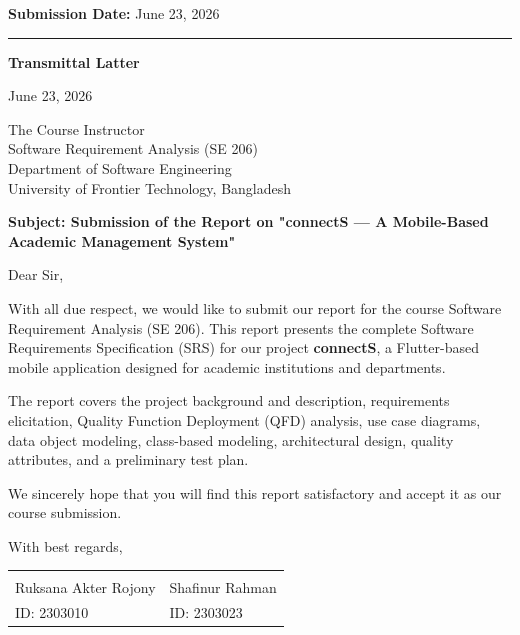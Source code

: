\documentclass[12pt,a4paper]{article}
\begin{document}
\begin{titlepage}
\begin{minipage}[t][\paperheight][s]{\paperwidth}
{\color{navyblue}\textbf{Submission Date:} June 23, 2026}
\vfill
{\color{green!70!black}\rule{\paperwidth}{3pt}}
\end{minipage}
\end{titlepage}
\restoregeometry

\newpage
\thispagestyle{plain}
\begin{center}{\large\bfseries\color{navyblue}  Transmittal Latter}\end{center}
\vspace{0.4em}

June 23, 2026

\medskip
The Course Instructor\\
Software Requirement Analysis (SE 206)\\
Department of Software Engineering\\
University of Frontier Technology, Bangladesh

\medskip
\textbf{Subject: Submission of the Report on "connectS --- A Mobile-Based Academic Management System"}

\medskip
Dear Sir,

With all due respect, we would like to submit our report for the course Software Requirement Analysis (SE 206). This report presents the complete Software Requirements Specification (SRS) for our project \textbf{connectS}, a Flutter-based mobile application designed for academic institutions and departments.

The report covers the project background and description, requirements elicitation, Quality Function Deployment (QFD) analysis, use case diagrams, data object modeling, class-based modeling, architectural design, quality attributes, and a preliminary test plan.

We sincerely hope that you will find this report satisfactory and accept it as our course submission.

\medskip
With best regards,

\vspace{0.8cm}
\begin{tabular}{p{5cm} p{5cm}}
\underline{\hspace{4.5cm}} & \underline{\hspace{4.5cm}} \\
Ruksana Akter Rojony & Shafinur Rahman \\
ID: 2303010 & ID: 2303023 \\
\end{tabular}
\end{document}
